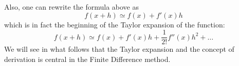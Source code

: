 \noindent Also, one can rewrite the formula above as
\begin{equation}
f(x+h) \simeq f(x) +  f'(x) h
\end{equation}
which is in fact the beginning of the Taylor expansion of the function:
\begin{equation}
f(x+h) \simeq f(x) +  f'(x) h + \frac{1}{2!} f''(x) h^2 + \dots 
\end{equation}
We will see in what follows that the Taylor expansion and the concept of derivation is 
central in the Finite Difference method. 

